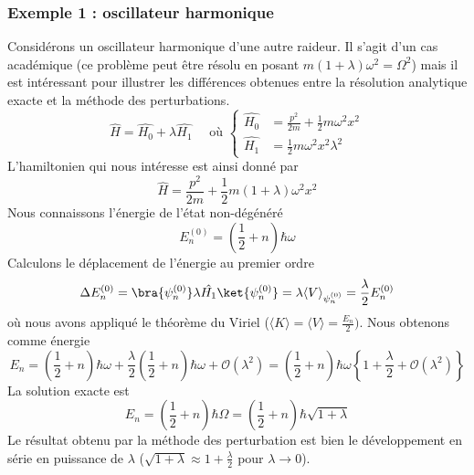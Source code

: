 			\subsubsection{Exemple 1 : oscillateur harmonique}
			Considérons un oscillateur harmonique d'une autre raideur. Il s'agit d'un cas académique 
			(ce problème peut être résolu en posant $m(1+\lambda)\omega^2=\Omega^2$) mais il est 
			intéressant pour illustrer les différences obtenues entre la résolution analytique 
			exacte et la méthode des perturbations.
			\begin{equation}
			\hat{H} = \hat{H_0}+\lambda\hat{H_1}\quad\text{ où }\left\{\begin{array}{ll}
			\hat{H_0} &= \frac{p^2}{2m}+\frac{1}{2}m\omega^2x^2\\
			\hat{H_1} &= \frac{1}{2}m\omega^2x^2\lambda^2
			\end{array}\right.
			\end{equation}
			L'hamiltonien qui nous intéresse est ainsi donné par
			\begin{equation}
			\hat{H} = \frac{p^2}{2m}+\frac{1}{2}m(1+\lambda)\omega^2x^2
			\end{equation}
			Nous connaissons l'énergie de l'état non-dégénéré
			\begin{equation}
			E_n^{(0)} = \left(\frac{1}{2}+n\right)\hbar\omega
			\end{equation}
			Calculons le déplacement de l'énergie au premier ordre
			\begin{equation}
			\Delta E_n^{(0)} = \bra{\psi_n^{(0)}}\lambda\hat{H_1}\ket{\psi_n^{(0)}} = \lambda \langle V
			\rangle_{\psi_n^{(0)}} = \frac{\lambda}{2}E_n^{(0)}
			\end{equation}
			où nous avons appliqué le théorème du Viriel ($\langle K \rangle = \langle V \rangle =
			\frac{E_n}{2})$. Nous obtenons comme énergie
			\begin{equation}
			E_n = \left(\frac{1}{2}+n\right)\hbar\omega+\frac{\lambda}{2}\left(\frac{1}{2}+n\right)\hbar
			\omega + \mathcal{O}(\lambda^2) = \left(\frac{1}{2}+n\right)\hbar\omega\left\{1+\frac{\lambda}{2}
			+\mathcal{O}(\lambda^2)\right\}
			\end{equation}
			La solution exacte est
			\begin{equation}
			E_n = \left(\frac{1}{2}+n\right)\hbar\Omega = \left(\frac{1}{2}+n\right)\hbar\sqrt{1+\lambda}
			\end{equation}
			Le résultat obtenu par la méthode des perturbation est bien le développement en série en 
			puissance de $\lambda$ ($\sqrt{1+\lambda}\approx 1+\frac{\lambda}{2}$ pour $\lambda\to0$).


